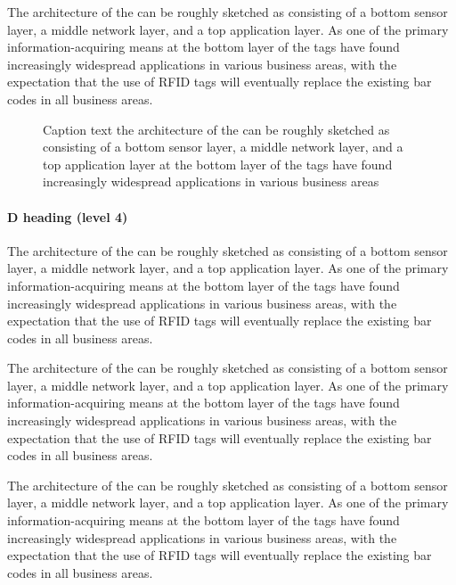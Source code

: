 \documentclass[10pt]{ietbook}
\begin{document}
The architecture of the can be roughly sketched
as consisting of a bottom sensor layer, a middle network layer, and a
top application layer. As one of the primary information-acquiring means
at the bottom layer of the
tags have found increasingly widespread applications in various business
areas, with the expectation that the use of RFID tags will eventually
replace the existing bar codes in all business areas.

\begin{figure}[!b]
\centerline{}
\caption{Caption text the architecture of the can be roughly sketched
as consisting of a bottom sensor layer, a middle network layer, and a
top application layer
at the bottom layer of the
tags have found increasingly widespread applications in various business
areas}
\end{figure}

\paragraph{D heading (level 4)}

The architecture of the can be roughly sketched
as consisting of a bottom sensor layer, a middle network layer, and a
top application layer. As one of the primary information-acquiring means
at the bottom layer of the
tags have found increasingly widespread applications in various business
areas, with the expectation that the use of RFID tags will eventually
replace the existing bar codes in all business areas.

The architecture of the can be roughly sketched
as consisting of a bottom sensor layer, a middle network layer, and a
top application layer. As one of the primary information-acquiring means
at the bottom layer of the
tags have found increasingly widespread applications in various business
areas, with the expectation that the use of RFID tags will eventually
replace the existing bar codes in all business areas.

The architecture of the can be roughly sketched
as consisting of a bottom sensor layer, a middle network layer, and a
top application layer. As one of the primary information-acquiring means
at the bottom layer of the
tags have found increasingly widespread applications in various business
areas, with the expectation that the use of RFID tags will eventually
replace the existing bar codes in all business areas.
\end{document}

